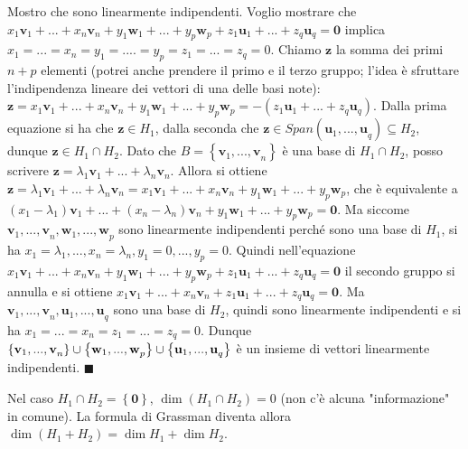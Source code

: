 \documentclass{article}
\begin{document}
Mostro che sono linearmente indipendenti. Voglio mostrare che $x_{1}\mathbf{v%
}_{1}+\mathbf{...+}x_{n}\mathbf{v}_{n}+y_{1}\mathbf{w}_{1}+\mathbf{...+}y_{p}%
\mathbf{w}_{p}+z_{1}\mathbf{u}_{1}+\mathbf{...+}z_{q}\mathbf{u}_{q}=\mathbf{0%
}$ implica $x_{1}=...=x_{n}=y_{1}=....=y_{p}=z_{1}=...=z_{q}=0$. Chiamo $%
\mathbf{z}$ la somma dei primi $n+p$ elementi (potrei anche prendere il
primo e il terzo gruppo; l'idea \`{e} sfruttare l'indipendenza lineare dei
vettori di una delle basi note): $\mathbf{z}=x_{1}\mathbf{v}_{1}+\mathbf{...+%
}x_{n}\mathbf{v}_{n}+y_{1}\mathbf{w}_{1}+\mathbf{...+}y_{p}\mathbf{w}%
_{p}=-\left( z_{1}\mathbf{u}_{1}+\mathbf{...+}z_{q}\mathbf{u}_{q}\right) $.
Dalla prima equazione si ha che $\mathbf{z}\in H_{1}$, dalla seconda che $%
\mathbf{z}\in Span\left( \mathbf{u}_{1}\mathbf{,...,u}_{q}\right) \subseteq
H_{2}$, dunque $\mathbf{z}\in H_{1}\cap H_{2}$. Dato che $B=\left\{ \mathbf{v%
}_{1}\mathbf{,...,v}_{n}\right\} $ \`{e} una base di $H_{1}\cap H_{2}$,
posso scrivere $\mathbf{z}=\lambda _{1}\mathbf{v}_{1}+\mathbf{...+}\lambda
_{n}\mathbf{v}_{n}$. Allora si ottiene $\mathbf{z}=\lambda _{1}\mathbf{v}%
_{1}+\mathbf{...+}\lambda _{n}\mathbf{v}_{n}=x_{1}\mathbf{v}_{1}+\mathbf{...+%
}x_{n}\mathbf{v}_{n}+y_{1}\mathbf{w}_{1}+\mathbf{...+}y_{p}\mathbf{w}_{p}$,
che \`{e} equivalente a $\left( x_{1}-\lambda _{1}\right) \mathbf{v}_{1}+%
\mathbf{...+}\left( x_{n}-\lambda _{n}\right) \mathbf{v}_{n}+y_{1}\mathbf{w}%
_{1}+\mathbf{...+}y_{p}\mathbf{w}_{p}=\mathbf{0}$. Ma siccome $\mathbf{v}_{1}%
\mathbf{,...,v}_{n},\mathbf{w}_{1}\mathbf{,...,w}_{p}$ sono linearmente
indipendenti perch\'{e} sono una base di $H_{1}$, si ha $x_{1}=\lambda _{1}%
\mathbf{,...,}x_{n}=\lambda _{n}\mathbf{,}y_{1}=0,\mathbf{...,}y_{p}=0$.
Quindi nell'equazione $x_{1}\mathbf{v}_{1}+\mathbf{...+}x_{n}\mathbf{v}%
_{n}+y_{1}\mathbf{w}_{1}+\mathbf{...+}y_{p}\mathbf{w}_{p}+z_{1}\mathbf{u}%
_{1}+\mathbf{...+}z_{q}\mathbf{u}_{q}=\mathbf{0}$ il secondo gruppo si
annulla e si ottiene $x_{1}\mathbf{v}_{1}+\mathbf{...+}x_{n}\mathbf{v}%
_{n}+z_{1}\mathbf{u}_{1}+\mathbf{...+}z_{q}\mathbf{u}_{q}=\mathbf{0}$. Ma $%
\mathbf{v}_{1}\mathbf{,...,v}_{n},\mathbf{u}_{1}\mathbf{,...,u}_{q}$ sono
una base di $H_{2}$, quindi sono linearmente indipendenti e si ha $%
x_{1}=...=x_{n}=z_{1}=...=z_{q}=0$. Dunque $\left\{ \mathbf{v}_{1}\mathbf{%
,...,v}_{n}\right\} \cup \left\{ \mathbf{w}_{1}\mathbf{,...,w}_{p}\right\}
\cup \left\{ \mathbf{u}_{1}\mathbf{,...,u}_{q}\right\} $ \`{e} un insieme di
vettori linearmente indipendenti. $\blacksquare $

Nel caso $H_{1}\cap H_{2}=\left\{ \mathbf{0}\right\} $, $\dim \left(
H_{1}\cap H_{2}\right) =0$ (non c'\`{e} alcuna "informazione" in comune). La
formula di Grassman diventa allora $\dim \left( H_{1}+H_{2}\right) =\dim
H_{1}+\dim H_{2}$.
\end{document}
